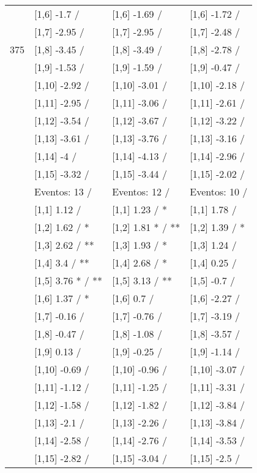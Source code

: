 \begin{table}
\begin{tabular}[t]{llll}
 & {}[1,6] -1.7  / & {}[1,6] -1.69  / & {}[1,6] -1.72  /\\
 & {}[1,7] -2.95  / & {}[1,7] -2.95  / & {}[1,7] -2.48  /\\
375 & {}[1,8] -3.45  / & {}[1,8] -3.49  / & {}[1,8] -2.78  /\\
\addlinespace
 & {}[1,9] -1.53  / & {}[1,9] -1.59  / & {}[1,9] -0.47  /\\
 & {}[1,10] -2.92  / & {}[1,10] -3.01  / & {}[1,10] -2.18  /\\
 & {}[1,11] -2.95  / & {}[1,11] -3.06  / & {}[1,11] -2.61  /\\
 & {}[1,12] -3.54  / & {}[1,12] -3.67  / & {}[1,12] -3.22  /\\
 & {}[1,13] -3.61  / & {}[1,13] -3.76  / & {}[1,13] -3.16  /\\
\addlinespace
 & {}[1,14] -4  / & {}[1,14] -4.13  / & {}[1,14] -2.96  /\\
 & {}[1,15] -3.32  / & {}[1,15] -3.44  / & {}[1,15] -2.02  /\\
 & Eventos:  13 / & Eventos:  12 / & Eventos:  10 /\\
 & {}[1,1] 1.12  / & {}[1,1] 1.23  / * & {}[1,1] 1.78  /\\
 & {}[1,2] 1.62  / * & {}[1,2] 1.81 * / ** & {}[1,2] 1.39  / *\\
\addlinespace
 & {}[1,3] 2.62  / ** & {}[1,3] 1.93  / * & {}[1,3] 1.24  /\\
 & {}[1,4] 3.4  / ** & {}[1,4] 2.68  / * & {}[1,4] 0.25  /\\
 & {}[1,5] 3.76 * / ** & {}[1,5] 3.13  / ** & {}[1,5] -0.7  /\\
 & {}[1,6] 1.37  / * & {}[1,6] 0.7  / & {}[1,6] -2.27  /\\
 & {}[1,7] -0.16  / & {}[1,7] -0.76  / & {}[1,7] -3.19  /\\
\addlinespace
500 & {}[1,8] -0.47  / & {}[1,8] -1.08  / & {}[1,8] -3.57  /\\
 & {}[1,9] 0.13  / & {}[1,9] -0.25  / & {}[1,9] -1.14  /\\
 & {}[1,10] -0.69  / & {}[1,10] -0.96  / & {}[1,10] -3.07  /\\
 & {}[1,11] -1.12  / & {}[1,11] -1.25  / & {}[1,11] -3.31  /\\
 & {}[1,12] -1.58  / & {}[1,12] -1.82  / & {}[1,12] -3.84  /\\
\addlinespace
 & {}[1,13] -2.1  / & {}[1,13] -2.26  / & {}[1,13] -3.84  /\\
 & {}[1,14] -2.58  / & {}[1,14] -2.76  / & {}[1,14] -3.53  /\\
 & {}[1,15] -2.82  / & {}[1,15] -3.04  / & {}[1,15] -2.5  /\\
\bottomrule
\end{tabular}
\end{table}
